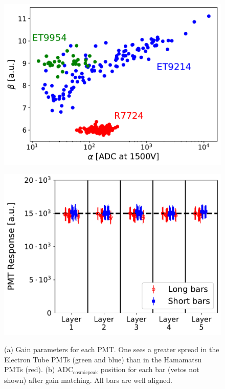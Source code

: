 \documentclass[3p,final,twocolumn]{elsarticle}
\begin{document}
\begin{figure}[th]
	\centering
		\begin{minipage}{0.46\textwidth}
			\includegraphics[width=\textwidth]{gainspread.pdf}
			\subcaption{}
			\label{fig:gain}
		\end{minipage}
		\begin{minipage}{0.46\textwidth}
			\includegraphics[width=\textwidth]{gainsadcresponse.pdf}
			\subcaption{}
		\label{fig:hv_settings}
		\end{minipage}
		\caption{ (a) Gain parameters for each PMT. One sees a greater spread in the Electron Tube PMTs (green and blue) than in the Hamamatsu PMTs (red).
		(b) $\mathrm{ADC}_{\mathrm{cosmic peak}}$ position for each bar (vetos not shown) after gain matching. All bars are well aligned.}
\end{figure}
\end{document}
